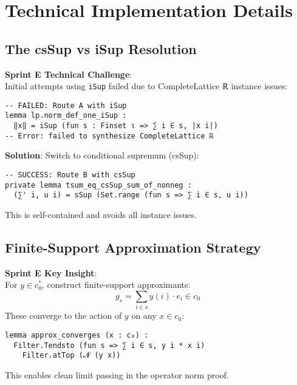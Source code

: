 \documentclass[11pt]{article}
\theoremstyle{definition}
\theoremstyle{remark}
\newcommand{\sprintE}{\textcolor{orange!70!black}{\textbf{Sprint E}}}
\begin{document}
\section{Technical Implementation Details}\label{sec:technical}

\subsection{The csSup vs iSup Resolution}

\begin{mdframed}[style=leanbox]
\textbf{\sprintE{} Technical Challenge}:\\
Initial attempts using \texttt{iSup} failed due to CompleteLattice ℝ instance issues:
\begin{verbatim}
-- FAILED: Route A with iSup
lemma lp.norm_def_one_iSup : 
  ‖x‖ = iSup (fun s : Finset ι => ∑ i ∈ s, |x i|)
-- Error: failed to synthesize CompleteLattice ℝ
\end{verbatim}

\textbf{Solution}: Switch to conditional supremum (csSup):
\begin{verbatim}
-- SUCCESS: Route B with csSup  
private lemma tsum_eq_csSup_sum_of_nonneg :
  (∑' i, u i) = sSup (Set.range (fun s => ∑ i ∈ s, u i))
\end{verbatim}
This is self-contained and avoids all instance issues.
\end{mdframed}

\subsection{Finite-Support Approximation Strategy}

\begin{mdframed}[style=leanbox]
\textbf{\sprintE{} Key Insight}:\\
For $y \in c_0^*$, construct finite-support approximants:
\[
g_s = \sum_{i \in s} y(i) \cdot e_i \in c_0
\]
These converge to the action of $y$ on any $x \in c_0$:
\begin{verbatim}
lemma approx_converges (x : c₀) : 
  Filter.Tendsto (fun s => ∑ i ∈ s, y i * x i) 
    Filter.atTop (𝓝 (y x))
\end{verbatim}
This enables clean limit passing in the operator norm proof.
\end{mdframed}

\end{document}
